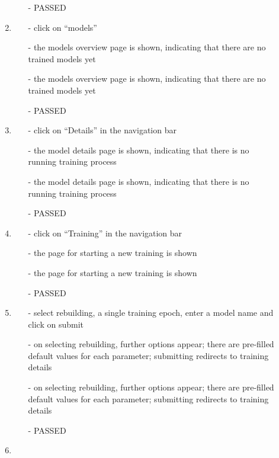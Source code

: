 \begin{description}
\begin{enumerate}
\begin{itemize}
			\item [-] PASSED
		\end{itemize}
		\item
		\begin{itemize}
			\item [-] click on \enquote{models}
			\item [-] the models overview page is shown, indicating that there are no trained models yet
			\item [-] the models overview page is shown, indicating that there are no trained models yet
			\item [-] PASSED
		\end{itemize}
		\item
		\begin{itemize}
			\item [-] click on \enquote{Details} in the navigation bar
			\item [-] the model details page is shown, indicating that there is no running training process
			\item [-] the model details page is shown, indicating that there is no running training process
			\item [-] PASSED
		\end{itemize}
		\item
		\begin{itemize}
			\item [-] click on \enquote{Training} in the navigation bar
			\item [-] the page for starting a new training is shown
			\item [-] the page for starting a new training is shown
			\item [-] PASSED
		\end{itemize}
		\item
		\begin{itemize}
			\item [-] select rebuilding, a single training epoch, enter a model name and click on submit
			\item [-] on selecting rebuilding, further options appear; there are pre-filled default values for each parameter; submitting redirects to training details
			\item [-] on selecting rebuilding, further options appear; there are pre-filled default values for each parameter; submitting redirects to training details
			\item [-] PASSED
		\end{itemize}
		\item

\end{enumerate}
\end{description}
